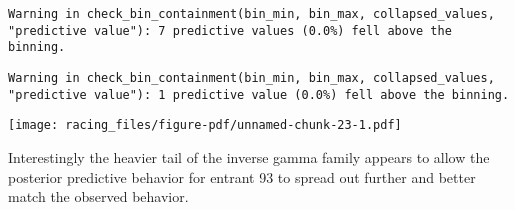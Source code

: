 \documentclass[
  letterpaper,
  DIV=11,
  numbers=noendperiod]{scrartcl}
\newenvironment{Shaded}{\begin{snugshade}}{\end{snugshade}}
\newcommand{\AttributeTok}[1]{\textcolor[rgb]{0.40,0.45,0.13}{#1}}
\newcommand{\ControlFlowTok}[1]{\textcolor[rgb]{0.00,0.23,0.31}{#1}}
\newcommand{\DecValTok}[1]{\textcolor[rgb]{0.68,0.00,0.00}{#1}}
\newcommand{\FunctionTok}[1]{\textcolor[rgb]{0.28,0.35,0.67}{#1}}
\newcommand{\NormalTok}[1]{\textcolor[rgb]{0.00,0.23,0.31}{#1}}
\newcommand{\OtherTok}[1]{\textcolor[rgb]{0.00,0.23,0.31}{#1}}
\newcommand{\SpecialCharTok}[1]{\textcolor[rgb]{0.37,0.37,0.37}{#1}}
\newcommand{\StringTok}[1]{\textcolor[rgb]{0.13,0.47,0.30}{#1}}
\begin{document}
\begin{verbatim}
Warning in check_bin_containment(bin_min, bin_max, collapsed_values,
"predictive value"): 7 predictive values (0.0%) fell above the binning.
\end{verbatim}

\begin{verbatim}
Warning in check_bin_containment(bin_min, bin_max, collapsed_values,
"predictive value"): 1 predictive value (0.0%) fell above the binning.
\end{verbatim}

\texttt{[image: racing\_files/figure-pdf/unnamed-chunk-23-1.pdf]}

Interestingly the heavier tail of the inverse gamma family appears to
allow the posterior predictive behavior for entrant 93 to spread out
further and better match the observed behavior.

\begin{Shaded}
\end{Shaded}
\end{document}
